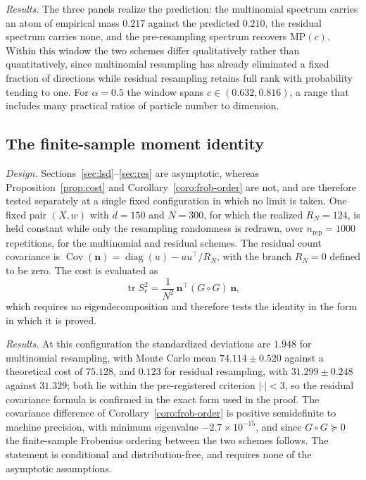 \documentclass[lettersize,journal]{IEEEtran}
\theoremstyle{remark}
\begin{document}
\emph{Results.} The three panels realize the prediction: the multinomial
spectrum carries an atom of empirical mass $0.217$ against the predicted
$0.210$, the residual spectrum carries none, and the pre-resampling spectrum
recovers $\mathrm{MP}(c)$. Within this window the two schemes differ
qualitatively rather than quantitatively, since multinomial resampling has
already eliminated a fixed fraction of directions while residual resampling
retains full rank with probability tending to one. For $\alpha=0.5$ the window
spans $c\in(0.632,0.816)$, a range that includes many practical ratios of
particle number to dimension.

\subsection{The finite-sample moment identity}
\label{sec:ix-t1}

\emph{Design.} Sections~\ref{sec:lsd}--\ref{sec:res} are asymptotic, whereas
Proposition~\ref{prop:cost} and Corollary~\ref{coro:frob-order} are not, and
are therefore tested separately at a single fixed configuration in which no
limit is taken. One fixed pair $(X,w)$ with $d=150$ and $N=300$, for which the
realized $R_N=124$, is held constant while only the resampling randomness is
redrawn, over $n_{\mathrm{rep}}=1000$ repetitions, for the multinomial and
residual schemes. The residual count covariance is
$\operatorname{Cov}(\bm{n})=\operatorname{diag}(u)-uu^\top/R_N$, with the
branch $R_N=0$ defined to be zero. The cost is evaluated as
\begin{equation}
  \operatorname{tr} S_r^2
    = \frac{1}{N^2}\,\bm{n}^\top (G\circ G)\,\bm{n},
  \label{eq:t1form}
\end{equation}
which requires no eigendecomposition and therefore tests the identity in the
form in which it is proved.

\emph{Results.} At this configuration the standardized deviations are
$1.948$ for multinomial resampling, with Monte Carlo mean $74.114\pm0.520$
against a theoretical cost of $75.128$, and $0.123$ for residual resampling,
with $31.299\pm0.248$ against $31.329$; both lie within the pre-registered
criterion $|\cdot|<3$, so the residual covariance formula is confirmed in the
exact form used in the proof. The covariance difference of
Corollary~\ref{coro:frob-order} is positive semidefinite to machine precision,
with minimum eigenvalue $-2.7\times10^{-15}$, and since $G\circ G\succeq0$ the
finite-sample Frobenius ordering between the two schemes follows. The statement
is conditional and distribution-free, and requires none of the asymptotic
assumptions.
\end{document}
